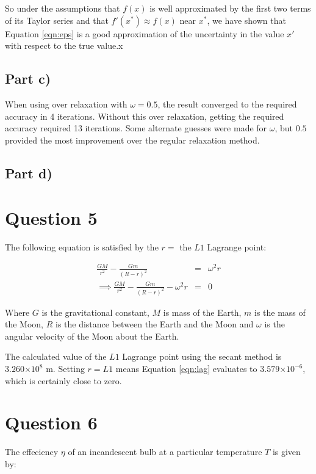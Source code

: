 \documentclass[a4paper,12pt]{article}
\providecommand{\e}[1]{\ensuremath{\times 10^{#1}}}
\begin{document}
So under the assumptions that $f(x)$ is well approximated by the first two terms of its Taylor series and that $f'(x^*)\approx f(x)$ near $x^*$, we have shown that Equation \ref{eqn:eps} is a good approximation of the uncertainty in the value $x'$ with respect to the true value.x

\subsection{Part c)}

When using over relaxation with $\omega = 0.5$, the result converged to the required accuracy in 4 iterations. Without this over relaxation, getting the required accuracy required 13 iterations. Some alternate guesses were made for $\omega$, but $0.5$ provided the most improvement over the regular relaxation method.

\subsection{Part d)}

\section{Question 5}

The following equation is satisfied by the $r =$ the $L1$ Lagrange point:

\begin{eqnarray}
\frac{GM}{r^2} - \frac{Gm}{(R-r)^2} &=& \omega^2r\nonumber\\
\implies \frac{GM}{r^2} - \frac{Gm}{(R-r)^2} - \omega^2r &=& 0
\label{eqn:lag}
\end{eqnarray}

Where $G$ is the gravitational constant, $M$ is mass of the Earth, $m$ is the mass of the Moon, $R$ is the distance between the Earth and the Moon and $\omega$ is the angular velocity of the Moon about the Earth.

The calculated value of the $L1$ Lagrange point using the secant method is $3.260\e{8}$ m. Setting $r = L1$ means Equation \ref{eqn:lag} evaluates to $3.579\e{-6}$, which is certainly close to zero.

\section{Question 6}

The effeciency $\eta$ of an incandescent bulb at a particular temperature $T$ is given by:
\end{document}
